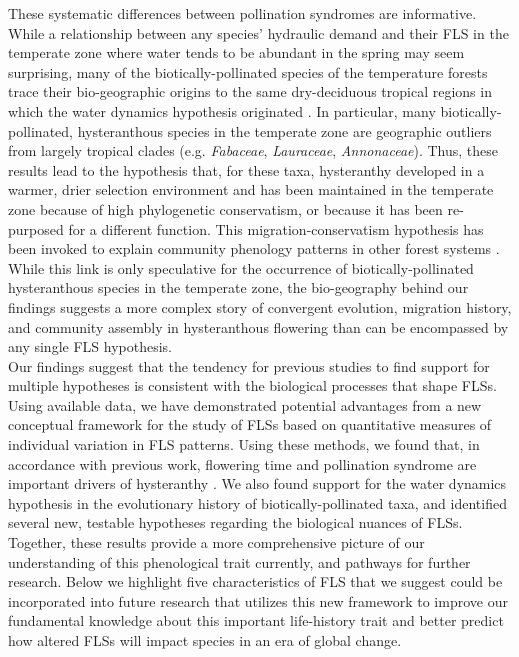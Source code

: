 \documentclass[11pt]{article}
\begin{document}
\noindent These systematic differences between pollination syndromes are informative. While a relationship between any species' hydraulic demand and their FLS in the temperate zone where water tends to be abundant in the spring \citep{Polgar2011} may seem surprising, many of the biotically-pollinated species of the temperature forests trace their bio-geographic origins to the same dry-deciduous tropical regions \citep{Daubenmire1972} in which the water dynamics hypothesis originated \citep{Janzen1967,Franklin2016}. In particular, many biotically-pollinated, hysteranthous species in the temperate zone are geographic outliers from largely tropical clades (e.g. \textit{Fabaceae}, \textit{Lauraceae}, \textit{Annonaceae}). Thus, these results lead to the hypothesis that, for these taxa, hysteranthy developed in a warmer, drier selection environment and has been maintained in the temperate zone because of high phylogenetic conservatism, or because it has been re-purposed for a different function. 
This migration-conservatism hypothesis has been invoked to explain community phenology patterns in other forest systems \citep[i.e. general flowering in dipterocarps,][]{Kurten2018}. While this link is only speculative for the occurrence of biotically-pollinated hysteranthous species in the temperate zone, the bio-geography behind our findings suggests a more complex story of convergent evolution, migration history, and community assembly in hysteranthous flowering than can be encompassed by any single FLS hypothesis.\\

\noindent Our findings suggest that the tendency for previous studies to find support for multiple hypotheses \citep{Bolmgren2003,Gougherty2018,Savage2019} is consistent with the biological processes that shape FLSs. Using available data, we have demonstrated potential advantages from a new conceptual framework for the study of FLSs based on quantitative measures of individual variation in FLS patterns. Using these methods, we found that, in accordance with previous work, flowering time and pollination syndrome are important drivers of hysteranthy \citep{Gougherty2018}. We also found support for the water dynamics hypothesis in the evolutionary history of biotically-pollinated taxa, and identified several new, testable hypotheses regarding the biological nuances of FLSs. Together, these results provide a more comprehensive picture of our understanding of this phenological trait currently, and pathways for further research. Below we highlight five characteristics of FLS that we suggest could be incorporated into future research that utilizes this new framework to improve our fundamental knowledge about this important life-history trait and better predict how altered FLSs will impact species in an era of global change.\\
\end{document}
